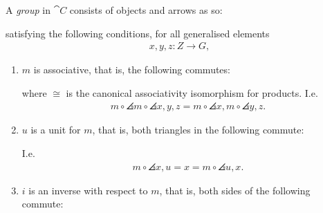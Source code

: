 \documentclass{article}
\begin{document}
\begin{definition}
	A \emph{group} in $\cat C$ consists of objects and arrows as so:

	\begin{center}
	\end{center}

	satisfying the following conditions, for all generalised elements
	\begin{align*}
		x,y,z:Z\to G,
	\end{align*}

	\begin{enumerate}
		\item $m$ is associative, that is, the following commutes: \begin{center}
		      \end{center}
		      where $\cong$ is the canonical associativity isomorphism for products. I.e. \begin{align*}
			      m\circ \angles{m\circ \angles{x,y}, z} = m\circ\angles{x,m\circ\angles{y,z}}.
		      \end{align*}
		\item $u$ is a unit for $m$, that is, both triangles in the following commute: \begin{center}
		      \end{center}
		      I.e. \begin{align*}
			      m\circ\angles{x,u} = x = m\circ\angles{u, x}.
		      \end{align*}
		\item $i$ is an inverse with respect to $m$, that is, both sides of the following commute: \begin{center}

\end{center}
\end{enumerate}
\end{definition}
\end{document}

